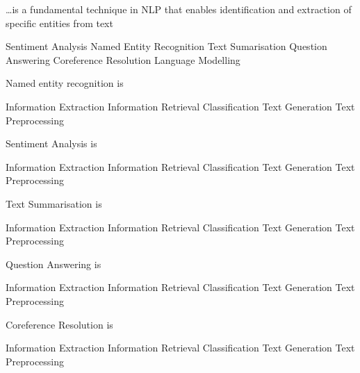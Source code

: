 \documentclass[theme=sleek, randomorder, hidesidemenu]{webquiz}
\begin{document}
\begin{question}
  \ldots is a fundamental technique in NLP that enables identification and extraction of specific entities from text
  \begin{choice}
    \incorrect Sentiment Analysis
    \correct Named Entity Recognition
    \incorrect Text Sumarisation
    \incorrect Question Answering
    \incorrect Coreference Resolution
    \incorrect Language Modelling
  \end{choice}
\end{question}

\begin{question}
  Named entity recognition is
  \begin{choice}
    \correct Information Extraction
    \incorrect Information Retrieval
    \incorrect Classification
    \incorrect Text Generation
    \incorrect Text Preprocessing
  \end{choice}
\end{question}

\begin{question}
  Sentiment Analysis is
  \begin{choice}
    \incorrect Information Extraction
    \incorrect Information Retrieval
    \correct Classification
    \incorrect Text Generation
    \incorrect Text Preprocessing
  \end{choice}
\end{question}

\begin{question}
  Text Summarisation is
  \begin{choice}
    \incorrect Information Extraction
    \incorrect Information Retrieval
    \incorrect Classification
    \correct Text Generation
    \incorrect Text Preprocessing
  \end{choice}
\end{question}

\begin{question}
  Question Answering is
  \begin{choice}
    \incorrect Information Extraction
    \correct Information Retrieval
    \incorrect Classification
    \incorrect Text Generation
    \incorrect Text Preprocessing
  \end{choice}
\end{question}

\begin{question}
  Coreference Resolution is
  \begin{choice}
    \incorrect Information Extraction
    \incorrect Information Retrieval
    \incorrect Classification
    \incorrect Text Generation
    \correct Text Preprocessing
  \end{choice}
\end{question}
\end{document}

